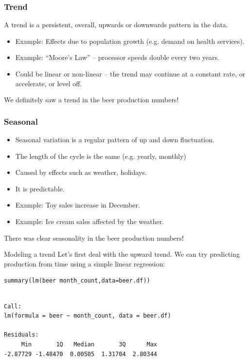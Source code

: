 \documentclass{beamer}\usepackage[]{graphicx}\usepackage[]{color}
\makeatletter
\newcommand{\hlopt}[1]{\textcolor[rgb]{1,0.894,0.769}{#1}}%
\newcommand{\hlstd}[1]{\textcolor[rgb]{1,0.894,0.769}{#1}}%
\newcommand{\hlkwc}[1]{\textcolor[rgb]{0.78,0.941,0.545}{#1}}%
\newcommand{\hlkwd}[1]{\textcolor[rgb]{1,0.78,0.769}{#1}}%
\newenvironment{kframe}{%
 \def\at@end@of@kframe{}%
 \ifinner\ifhmode%
  \def\at@end@of@kframe{\end{minipage}}%
  \begin{minipage}{\columnwidth}%
 \fi\fi%
 \def\FrameCommand##1{\hskip\@totalleftmargin \hskip-\fboxsep
 \colorbox{shadecolor}{##1}\hskip-\fboxsep
     \hskip-\linewidth \hskip-\@totalleftmargin \hskip\columnwidth}%
 \MakeFramed {\advance\hsize-\width
   \@totalleftmargin\z@ \linewidth\hsize
   \@setminipage}}%
 {\par\unskip\endMakeFramed%
 \at@end@of@kframe}
\newenvironment{knitrout}{}{} %
\makeatother
\begin{document}
\begin{darkframes}
\begin{frame}
\end{frame}
\begin{frame}
\frametitle{Trend}
A \alert{trend} is a persistent, overall, upwards or downwards pattern in the data.
\begin{itemize}
\item Example: Effects due to population growth (e.g. demand on health services).
\item Example: ``Moore's Law'' -- processor speeds double every two years.
\item Could be linear or non-linear -- the trend may continue at a constant rate, or accelerate, or level off.
\end{itemize}
We definitely saw a trend in the beer production numbers!
\end{frame}
    
\begin{frame}
\frametitle{Seasonal}
\begin{itemize}
\item \alert{Seasonal variation} is a regular pattern of up and down fluctuation.
\item The length of the cycle is the same (e.g. yearly, monthly)
\item Caused by effects such as weather, holidays.
\item It is predictable.
\item Example: Toy sales increase in December.
\item Example: Ice cream sales affected by the weather.
\end{itemize}
There was clear seasonality in the beer production numbers!
\lc
\end{frame}


\begin{frame}[fragile]{Modeling a trend}
    \fontsize{8}{8}\selectfont
      Let's first deal with the upward trend. We can try predicting production from time using a simple linear regression:
\begin{knitrout}
\begin{kframe}
\begin{alltt}
\hlkwd{summary}\hlstd{(}\hlkwd{lm}\hlstd{(beer} \hlopt{~} \hlstd{month_count,} \hlkwc{data}\hlstd{=beer.df))}
\end{alltt}
\begin{verbatim}

Call:
lm(formula = beer ~ month_count, data = beer.df)

Residuals:
     Min       1Q   Median       3Q      Max 
-2.87729 -1.48470  0.00505  1.31704  2.80344 


\end{verbatim}
\end{kframe}
\end{knitrout}
\end{frame}
\end{darkframes}
\end{document}
